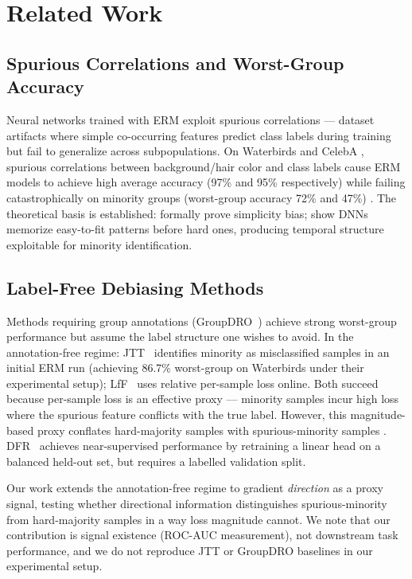 \section{Related Work}
\label{sec:related}

\subsection{Spurious Correlations and Worst-Group Accuracy}

Neural networks trained with ERM exploit spurious correlations --- dataset artifacts where simple co-occurring features predict class labels during training but fail to generalize across subpopulations.
On Waterbirds \citep{Wah2011Caltech,Sagawa2020Distributionally} and CelebA \citep{Liu2015Deep}, spurious correlations between background/hair color and class labels cause ERM models to achieve high average accuracy (97\% and 95\% respectively) while failing catastrophically on minority groups (worst-group accuracy 72\% and 47\%) \citep{Sagawa2020Distributionally}.
The theoretical basis is established: \citet{Shah2020Pitfalls} formally prove simplicity bias; \citet{Arpit2017Closer} show DNNs memorize easy-to-fit patterns before hard ones, producing temporal structure exploitable for minority identification.

\subsection{Label-Free Debiasing Methods}

Methods requiring group annotations (GroupDRO~\citep{Sagawa2020Distributionally}) achieve strong worst-group performance but assume the label structure one wishes to avoid.
In the annotation-free regime: JTT~\citep{Liu2021Just} identifies minority as misclassified samples in an initial ERM run (achieving 86.7\% worst-group on Waterbirds under their experimental setup); LfF~\citep{Nam2020Learning} uses relative per-sample loss online.
Both succeed because per-sample loss is an effective proxy --- minority samples incur high loss where the spurious feature conflicts with the true label.
However, this magnitude-based proxy conflates hard-majority samples with spurious-minority samples \citep{Liu2021Just,Kirichenko2022Last}.
DFR~\citep{Kirichenko2022Last} achieves near-supervised performance by retraining a linear head on a balanced held-out set, but requires a labelled validation split.

Our work extends the annotation-free regime to gradient \emph{direction} as a proxy signal, testing whether directional information distinguishes spurious-minority from hard-majority samples in a way loss magnitude cannot.
We note that our contribution is signal existence (ROC-AUC measurement), not downstream task performance, and we do not reproduce JTT or GroupDRO baselines in our experimental setup.

